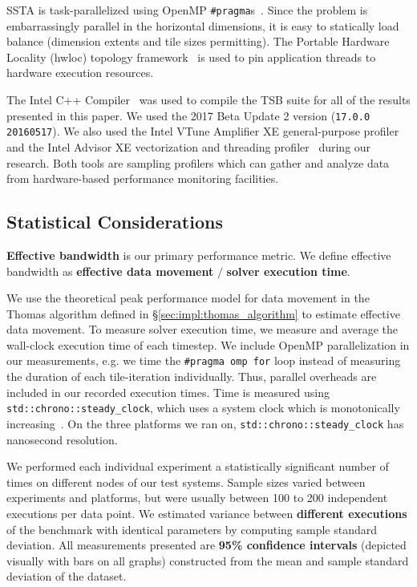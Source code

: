 \documentclass[10pt, conference, compsocconf]{IEEEtran}
\begin{document}
SSTA is task-parallelized using OpenMP \lstinline{#pragma}s~\cite{openmp_spec}.
Since the problem is embarrassingly parallel in the horizontal dimensions, it
  is easy to statically load balance (dimension extents and tile sizes
  permitting).
The Portable Hardware Locality (hwloc) topology
  framework~\cite{hwloc} is used to pin application threads to hardware execution
  resources.

The Intel C++ Compiler~\cite{intel_cpp_compiler} was used to compile the TSB
  suite for all of the results presented in this paper.
We used the 2017 Beta Update 2 version (\lstinline{17.0.0 20160517}).
We also used the Intel VTune Amplifier XE general-purpose
  profiler~\cite{intel_vtune_amplifier} and the Intel Advisor XE vectorization
  and threading profiler~\cite{intel_advisor} during our research.
Both tools are sampling profilers which can gather and analyze data from
  hardware-based performance monitoring facilities.

\subsection{Statistical Considerations}
\label{sec:setup:stats}

\textbf{Effective bandwidth} is our primary performance metric.
We define effective bandwidth as \textbf{effective data movement} \(/\)
  \textbf{solver execution time}.

We use the theoretical peak performance model for data movement in the Thomas
  algorithm defined in \S\ref{sec:impl:thomas_algorithm} to estimate
  effective data movement.
To measure solver execution time, we measure and average the wall-clock
  execution time of each timestep. 
We include OpenMP parallelization in our measurements, e.g. we time the
  \lstinline{#pragma omp for} loop instead of measuring the duration of each
  tile-iteration individually.
Thus, parallel overheads are included in our recorded execution times.
Time is measured using \lstinline{std::chrono::steady_clock}, which uses a
  system clock which is monotonically increasing~\cite{cppreference_chrono_steady_clock}.
On the three platforms we ran on, \lstinline{std::chrono::steady_clock} has
  nanosecond resolution.

We performed each individual experiment a statistically significant number of 
  times on different nodes of our test systems.
Sample sizes varied between experiments and platforms, but were usually between
  100 to 200 independent executions per data point.
We estimated variance between \textbf{different
  executions} of the benchmark with identical parameters by computing sample
  standard deviation.
All measurements presented are \textbf{95\% confidence intervals} (depicted
  visually with bars on all graphs) constructed from the mean and sample standard
  deviation of the dataset.
 
\end{document}
